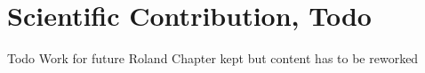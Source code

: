 \section{Scientific Contribution, Todo}

Todo
Work for future Roland
Chapter kept but content has to be reworked
